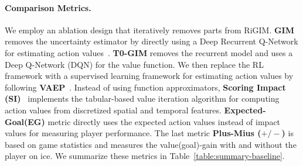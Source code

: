 \documentclass{article}
\newcommand{\sys}{RiGIM}
\newcommand{\system}{\sys\;}
\begin{document}
\paragraph{Comparison Metrics.} We employ an ablation design that iteratively removes parts from \system.  {\bf GIM} removes the uncertainty estimator by directly using a Deep Recurrent Q-Network for estimating action values~\cite{Liu2018DRL}. {\bf T0-GIM} removes the recurrent model and uses a Deep Q-Network (DQN) for the value function. We then replace the RL framework with a supervised learning framework for estimating action values by following {\bf VAEP}~\cite{Decroos2019Actions}. Instead of using function approximators, {\bf Scoring Impact (SI)}~\cite{Routley2015Markov} implements the tabular-based value iteration algorithm for computing action values from discretized spatial and temporal features. {\bf Expected-Goal(EG)} metric directly uses the expected action values instead of impact values for measuring player performance. The last 
metric {\bf  Plus-Mius ($+/-$)}
is based on game statistics and measures the value(goal)-gain with and without the player on ice. We summarize these metrics in Table~\ref{table:summary-baseline}.
\end{document}
